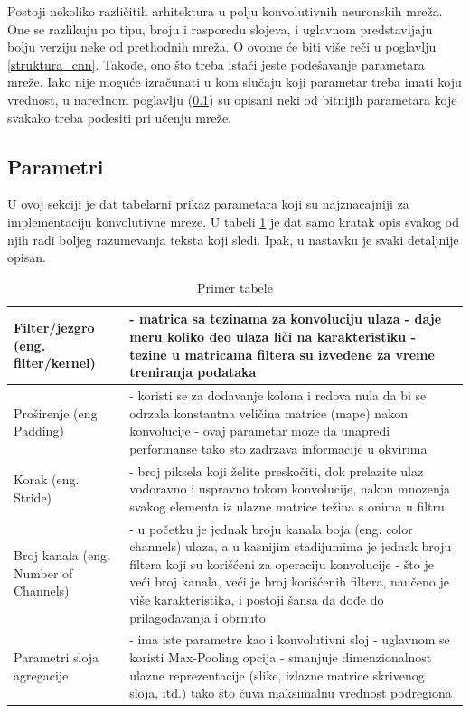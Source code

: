 \documentclass[a4paper]{article}
\begin{document}
Postoji nekoliko različitih arhitektura u polju konvolutivnih neuronskih mreža. One se razlikuju po tipu, broju i rasporedu slojeva, i uglavnom predstavljaju bolju verziju neke od prethodnih mreža. O ovome će biti više reči u poglavlju \ref{struktura_cnn}. Takođe, ono što treba istaći jeste podešavanje parametara mreže. Iako nije moguće izračunati u kom slučaju koji parametar treba imati koju vrednost, u narednom poglavlju (\ref{parametri_sec}) su opisani neki od bitnijih parametara koje svakako treba podesiti pri učenju mreže.


\subsection{Parametri}
\label{parametri_sec}

U ovoj sekciji je dat tabelarni prikaz parametara koji su najznacajniji za implementaciju konvolutivne mreze. U tabeli \ref{tabela_parametri} je dat samo kratak opis svakog od njih radi boljeg razumevanja teksta koji sledi. Ipak, u nastavku je svaki detaljnije opisan.

\begin{table}[h!]
\begin{center}
\caption{Primer tabele}
\begin{tabular}{|l|p{60mm}|}
\hline
Filter/jezgro (eng. filter/kernel) &
- matrica sa tezinama za konvoluciju ulaza \newline
- daje meru koliko deo ulaza liči na karakteristiku \newline
- tezine u matricama filtera su izvedene za vreme treniranja podataka
\\
\hline
Proširenje (eng. Padding) &
- koristi se za dodavanje kolona i redova nula da bi se odrzala konstantna veličina matrice (mape) nakon konvolucije \newline
- ovaj parametar moze da unapredi performanse tako sto zadrzava informacije u okvirima
\\
\hline 
Korak (eng. Stride) &
- broj piksela koji želite preskočiti, dok prelazite ulaz vodoravno i uspravno tokom konvolucije, nakon mnozenja svakog elementa iz ulazne matrice težina s onima u filtru
\\
\hline 
Broj kanala (eng. Number of Channels) &
- u početku je jednak broju kanala boja (eng. color channels) ulaza, a u kasnijim stadijumima je jednak broju filtera koji su korišćeni za operaciju konvolucije \newline
- što je veći broj kanala, veći je broj korišćenih filtera, naučeno je više karakteristika, i postoji šansa da dođe do prilagođavanja i obrnuto
\\
\hline 
Parametri sloja agregacije &
- ima iste parametre kao i konvolutivni sloj \newline
- uglavnom se koristi Max-Pooling opcija \newline
- smanjuje dimenzionalnost ulazne reprezentacije (slike, izlazne matrice skrivenog sloja, itd.) tako što čuva maksimalnu vrednost podregiona
\\
\hline 
\end{tabular}
\label{tabela_parametri}
\end{center}
\end{table}
\end{document}
